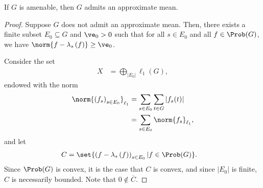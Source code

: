\begin{proposition}\label{prop:amenable_implies_approx_mean}
  If $G$ is amenable, then $G$ admits an approximate mean.
\end{proposition}
\begin{proof}
  Suppose $G$ does not admit an approximate mean. Then, there exists a finite subset $E_0\subseteq G$ and $\ve_0 > 0$ such that for all $s\in E_0$ and all $f\in \Prob(G)$, we have $\norm{f - \lambda_s\left(f\right)} \geq \ve_0$.\newline

  Consider the set
  \begin{align*}
    X &= \bigoplus_{\left\vert E_0 \right\vert} \ell_1\left(G\right),
  \end{align*}
  endowed with the norm
  \begin{align*}
    \norm{\left(f_s\right)_{s\in E_0}}_{\ell_1} &= \sum_{s\in E_0}\sum_{t\in G}\left\vert f_s(t) \right\vert\\
                                       &= \sum_{s\in E_0}\norm{f_s}_{\ell_1},
  \end{align*}
  and let
  \begin{align*}
    C &= \set{\left(f - \lambda_s\left(f\right)\right)_{s\in E_0} | f\in \Prob(G)}.
  \end{align*}
  Since $\Prob(G)$ is convex, it is the case that $C$ is convex, and since $\left\vert E_0 \right\vert$ is finite, $C$ is necessarily bounded. Note that $0\notin \overline{C}$.\newline


\end{proof}
